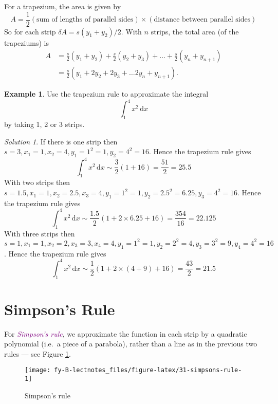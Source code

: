 \documentclass[
  english,
  11pt,
  oneside]{book}
\newcommand{\slide}{}
\theoremstyle{definition}
\theoremstyle{definition}
\newtheorem{example}{Example}[chapter]
\theoremstyle{definition}
\theoremstyle{definition}
\theoremstyle{remark}
\newtheorem*{solution}{Solution}
\begin{document}
For a trapezium, the area is given by
\[
A =\frac12(\text{sum of lengths of parallel sides}) \times(\text{distance between parallel sides})
\]
So for each strip \(\delta A =s(y_1+y_2)/2\). With \(n\) strips, the total area (of the trapeziums) is
\begin{align*}
A& = \frac s2(y_1+y_2) + \frac s2(y_2+y_3) + \ldots + \frac s2(y_{n}+y_{n+1})\\
&= \frac s2\left(y_1+2y_2+2y_3+\ldots 2y_{n}+y_{n+1}\right).
\end{align*}

\slide

\begin{example}
Use the trapezium rule to approximate the integral
\[
\int_1^4x^2\,\mathrm{d}x
\]
by taking 1, 2 or 3 strips.
\end{example}

\begin{solution}
If there is one strip then \(s=3, x_1=1, x_2 = 4, y_1=1^2=1, y_2=4^2=16\). Hence the trapezium rule gives
\[
\int_1^4 x^2 \,\mathrm{d}x \sim \frac32\left(1+16\right) = \frac{51}{2} = 25.5
\]
With two strips then \(s=1.5,x_1=1, x_2=2.5, x_3=4, y_1=1^2=1, y_2=2.5^2=6.25, y_3=4^2=16\). Hence the trapezium rule gives
\[
\int_1^4 x^2 \,\mathrm{d}x \sim \frac{1.5}2\left(1+2\times6.25+16\right) = \frac{354}{16} = 22.125
\]
With three strips then \(s=1,x_1=1, x_2=2, x_3 = 3, x_4=4, y_1=1^2=1, y_2=2^2=4, y_3=3^2=9, y_4=4^2=16\). Hence the trapezium rule gives
\[
\int_1^4 x^2 \,\mathrm{d}x \sim \frac{1}2\left(1+2\times(4+9)+16\right) = \frac{43}{2} = 21.5
\]
\end{solution}

\slide

\begin{slidesonly}

\hbox{}
\slide

\end{slidesonly}

\section{Simpson's Rule}\label{simpsons-rule}

For \textcolor{purple}{\em Simpson's rule}, we approximate the function in each strip by a quadratic polynomial (i.e.~a piece of a parabola), rather than a line as in the previous two rules --- see Figure \ref{fig:31-simpsons-rule}.

\begin{figure}

{\centering \texttt{[image: fy-B-lectnotes\_files/figure-latex/31-simpsons-rule-1]} 

}

\caption{Simpson's rule}\label{fig:31-simpsons-rule}
\end{figure}
\end{document}
